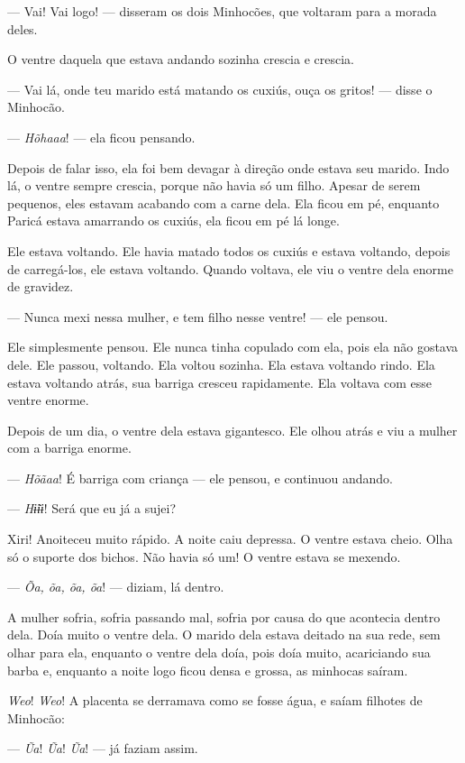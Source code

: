 --- Vai! Vai logo! --- disseram os dois Minhocões, que voltaram para a
morada deles. 

O ventre daquela que estava andando sozinha crescia e crescia. 

--- Vai lá, onde teu marido está matando os cuxiús, ouça os gritos! ---
disse o Minhocão. 

--- \textit{Hõhaaa}! --- ela ficou pensando.

Depois de falar isso, ela foi bem devagar à direção onde estava seu
marido. Indo lá, o ventre sempre crescia, porque não havia só um filho.
Apesar de serem pequenos, eles estavam acabando com a carne dela. Ela
ficou em pé, enquanto Paricá estava amarrando os cuxiús, ela ficou em pé
lá longe. 

Ele estava voltando. Ele havia matado todos os cuxiús e estava voltando,
depois de carregá-los, ele estava voltando. Quando voltava, ele viu o
ventre dela enorme de gravidez. 

--- Nunca mexi nessa mulher, e tem filho nesse ventre! --- ele pensou. 

Ele simplesmente pensou. Ele nunca tinha copulado com ela, pois ela não
gostava dele. Ele passou, voltando. Ela voltou sozinha. Ela estava
voltando rindo. Ela estava voltando atrás, sua barriga cresceu
rapidamente. Ela voltava com esse ventre enorme. 

Depois de um dia, o ventre dela estava gigantesco. Ele olhou atrás e viu
a mulher com a barriga enorme. 

--- \textit{Hõãaa}! É barriga com criança --- ele pensou, e continuou andando. 

--- \textit{Hɨ̃ɨɨ}! Será que eu já a sujei?

Xiri! Anoiteceu muito rápido. A noite caiu depressa. O ventre estava
cheio. Olha só o suporte dos bichos. Não havia só um! O ventre estava se
mexendo. 

--- \textit{Õa, õa, õa, õa}! --- diziam, lá dentro. 

A mulher sofria, sofria passando mal, sofria por causa do que acontecia
dentro dela. Doía muito o ventre dela. O marido dela estava deitado na
sua rede, sem olhar para ela, enquanto o ventre dela doía, pois doía
muito, acariciando sua barba e, enquanto a noite logo ficou densa e
grossa, as minhocas saíram.

\textit{Weo}! \textit{Weo}! A placenta se derramava como se fosse água, e saíam filhotes de
Minhocão:

--- \textit{Ũa}! \textit{Ũa}! \textit{Ũa}! --- já faziam assim. 

